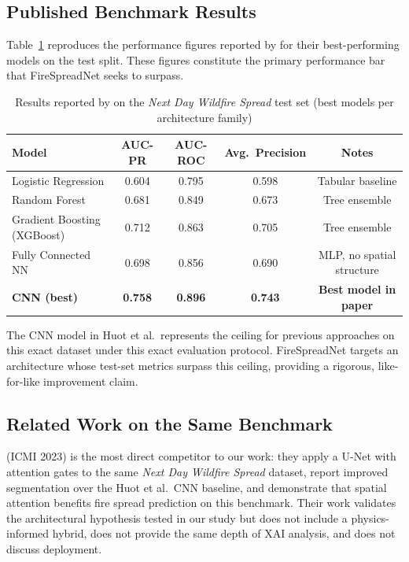 \subsection{Published Benchmark Results}

Table~\ref{tab:huot_results} reproduces the performance figures reported by \citet{huot2022next} for their best-performing models on the test split.
These figures constitute the primary performance bar that FireSpreadNet seeks to surpass.

\begin{table}[H]
    \centering
    \caption{Results reported by \citet{huot2022next} on the \textit{Next Day Wildfire Spread} test set (best models per architecture family)}
    \label{tab:huot_results}
    \renewcommand{\arraystretch}{1.3}
    \begin{tabular}{|l|c|c|c|c|}
        \hline
        \textbf{Model} & \textbf{AUC-PR} & \textbf{AUC-ROC} & \textbf{Avg.\ Precision} & \textbf{Notes} \\
        \hline\hline
        Logistic Regression & 0.604 & 0.795 & 0.598 & Tabular baseline \\
        Random Forest & 0.681 & 0.849 & 0.673 & Tree ensemble \\
        Gradient Boosting (XGBoost) & 0.712 & 0.863 & 0.705 & Tree ensemble \\
        Fully Connected NN & 0.698 & 0.856 & 0.690 & MLP, no spatial structure \\
        \textbf{CNN (best)} & \textbf{0.758} & \textbf{0.896} & \textbf{0.743} & \textbf{Best model in paper} \\
        \hline
    \end{tabular}
\end{table}

The CNN model in Huot et al.\ represents the ceiling for previous approaches on this exact dataset under this exact evaluation protocol.
FireSpreadNet targets an architecture whose test-set metrics surpass this ceiling, providing a rigorous, like-for-like improvement claim.

\subsection{Related Work on the Same Benchmark}

\citet{fitzgerald2023attention} (ICMI 2023) is the most direct competitor to our work: they apply a U-Net with attention gates to the same \textit{Next Day Wildfire Spread} dataset, report improved segmentation over the Huot et al.\ CNN baseline, and demonstrate that spatial attention benefits fire spread prediction on this benchmark.
Their work validates the architectural hypothesis tested in our study but does not include a physics-informed hybrid, does not provide the same depth of XAI analysis, and does not discuss deployment.

